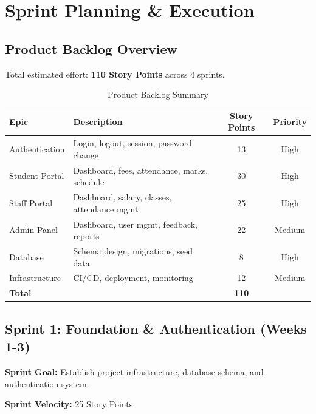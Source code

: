 \documentclass[12pt,a4paper]{article}
\begin{document}
\section{Sprint Planning \& Execution}

\subsection{Product Backlog Overview}

Total estimated effort: \textbf{110 Story Points} across 4 sprints.

\begin{table}[H]
\centering
\begin{tabularx}{\textwidth}{|l|X|c|c|}
\hline
\textbf{Epic} & \textbf{Description} & \textbf{Story Points} & \textbf{Priority} \\
\hline
Authentication & Login, logout, session, password change & 13 & High \\
\hline
Student Portal & Dashboard, fees, attendance, marks, schedule & 30 & High \\
\hline
Staff Portal & Dashboard, salary, classes, attendance mgmt & 25 & High \\
\hline
Admin Panel & Dashboard, user mgmt, feedback, reports & 22 & Medium \\
\hline
Database & Schema design, migrations, seed data & 8 & High \\
\hline
Infrastructure & CI/CD, deployment, monitoring & 12 & Medium \\
\hline
\textbf{Total} & & \textbf{110} & \\
\hline
\end{tabularx}
\caption{Product Backlog Summary}
\end{table}

\subsection{Sprint 1: Foundation \& Authentication (Weeks 1-3)}

\textbf{Sprint Goal:} Establish project infrastructure, database schema, and authentication system.

\textbf{Sprint Velocity:} 25 Story Points
\end{document}
